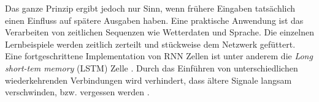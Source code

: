 Das ganze Prinzip ergibt jedoch nur Sinn, wenn frühere Eingaben tatsächlich einen Einfluss auf spätere Ausgaben haben. Eine praktische Anwendung ist das Verarbeiten von zeitlichen Sequenzen wie Wetterdaten und Sprache. Die einzelnen Lernbeispiele werden  zeitlich zerteilt und stückweise dem Netzwerk gefüttert.
Eine fortgeschrittene Implementation von RNN Zellen ist unter anderem die \textit{Long short-tem memory} (LSTM) Zelle \parencite{schmidhuber}. Durch das Einführen von unterschiedlichen wiederkehrenden Verbindungen wird verhindert, dass ältere Signale langsam verschwinden, bzw. vergessen werden \parencite{chollet}.